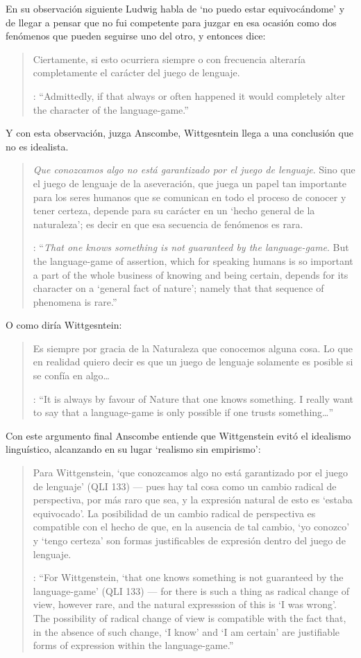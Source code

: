 En su observación siguiente Ludwig habla de \enquote*{no puedo estar equivocándome} y de llegar a pensar que no fui competente para juzgar en esa ocasión como dos fenómenos que pueden seguirse uno del otro, y entonces dice: \blockquote[{\cite[\S646]{wittgenstein1969oncert}}: \enquote{Admittedly, if that always or often happened it would completely alter the character of the language-game.}]{Ciertamente, si esto ocurriera siempre o con frecuencia alteraría completamente el carácter del juego de lenguaje.} Y con esta observación, juzga Anscombe, Wittgesntein llega a una conclusión que no es idealista.  \blockquote[{\cite[133]{anscombe1981parmenides:qli}}: \enquote{\emph{That one knows something is not guaranteed by the language-game}. \textelp{} But the language-game of assertion, which for speaking humans is so important a part of the whole business of knowing and being certain, depends for its character on a `general fact of nature'; namely that that sequence of phenomena is rare.}]{\emph{Que conozcamos algo no está garantizado por el juego de lenguaje}. Sino que el juego de lenguaje de la aseveración, que juega un papel tan importante para los seres humanos que se comunican en todo el proceso de conocer y tener certeza, depende para su carácter en un `hecho general de la naturaleza'; es decir en que esa secuencia de fenómenos es rara.} O como diría Wittgesntein: \blockquote[{\cite[\S505; 509]{wittgenstein1969oncert}}: \enquote{It is always by favour of Nature that one knows something. \textelp{} I really want to say that a language-game is only possible if one trusts something\ldots}]{Es siempre por gracia de la Naturaleza que conocemos alguna cosa. \textelp{} Lo que en realidad quiero decir es que un juego de lenguaje solamente es posible si se confía en algo\ldots}.

Con este argumento final Anscombe entiende que Wittgenstein evitó el idealismo linguístico, alcanzando en su lugar `realismo sin empirismo': \blockquote[{\cite[224]{teichmann2008ans}}: \enquote{For Wittgenstein, `that one knows something is not guaranteed by the language-game' (QLI 133) --- for there is such a thing as radical change of view, however rare, and the natural expresssion of this is `I was wrong'. The possibility of radical change of view is compatible with the fact that, in the absence of such change, `I know' and `I am certain' are justifiable forms of expression within the language-game.}]{Para Wittgenstein, `que conozcamos algo no está garantizado por el juego de lenguaje' (QLI 133) --- pues hay tal cosa como un cambio radical de perspectiva, por más raro que sea, y la expresión natural de esto es `estaba equivocado'. La posibilidad de un cambio radical de perspectiva es compatible con el hecho de que, en la ausencia de tal cambio, `yo conozco' y `tengo certeza' son formas justificables de expresión dentro del juego de lenguaje.}

